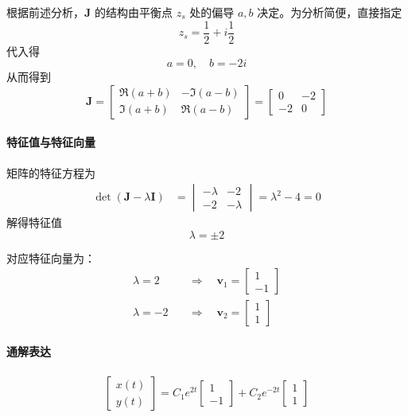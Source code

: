 根据前述分析，$\bm{J}$ 的结构由平衡点 $z_s$ 处的偏导 $a,b$ 决定。为分析简便，直接指定
\[
z_s = \frac{1}{2} + i\frac{1}{2}
\]
代入得
\[
a = 0, \quad b = -2i
\]
从而得到
\[
\bm{J} =
\begin{bmatrix}
    \Re(a + b) & -\Im(a - b) \\
    \Im(a + b) & \Re(a - b)
\end{bmatrix}
=
\begin{bmatrix}
    0 & -2 \\
    -2 & 0
\end{bmatrix}
\]

\paragraph{特征值与特征向量}
矩阵的特征方程为
\begin{align*}
    \det(\bm{J} - \lambda \bm{I}) &= 
    \begin{vmatrix}
        -\lambda & -2 \\
        -2 & -\lambda
    \end{vmatrix}
    = \lambda^2 - 4 = 0
\end{align*}
解得特征值
\[
\lambda = \pm 2
\]

对应特征向量为：
\begin{align*}
\lambda = 2 \quad &\Rightarrow\quad \bm{v}_1 = \begin{bmatrix} 1 \\ -1 \end{bmatrix} \\
\lambda = -2 \quad &\Rightarrow\quad \bm{v}_2 = \begin{bmatrix} 1 \\ 1 \end{bmatrix}
\end{align*}

\paragraph{通解表达}
\begin{align*}
\begin{bmatrix}
    x(t) \\
    y(t)
\end{bmatrix}
=
C_1 e^{2t}
\begin{bmatrix}
    1 \\
    -1
\end{bmatrix}
+
C_2 e^{-2t}
\begin{bmatrix}
    1 \\
    1
\end{bmatrix}
\end{align*}

